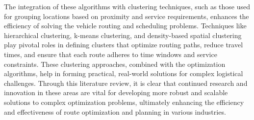 The integration of these algorithms with clustering techniques, such as those used for grouping locations based on proximity and service requirements, enhances the efficiency of solving the vehicle routing and scheduling problems. Techniques like hierarchical clustering, k-means clustering, and density-based spatial clustering play pivotal roles in defining clusters that optimize routing paths, reduce travel times, and ensure that each route adheres to time windows and service constraints. These clustering approaches, combined with the optimization algorithms, help in forming practical, real-world solutions for complex logistical challenges. Through this literature review, it is clear that continued research and innovation in these areas are vital for developing more robust and scalable solutions to complex optimization problems, ultimately enhancing the efficiency and effectiveness of route optimization and planning in various industries.









